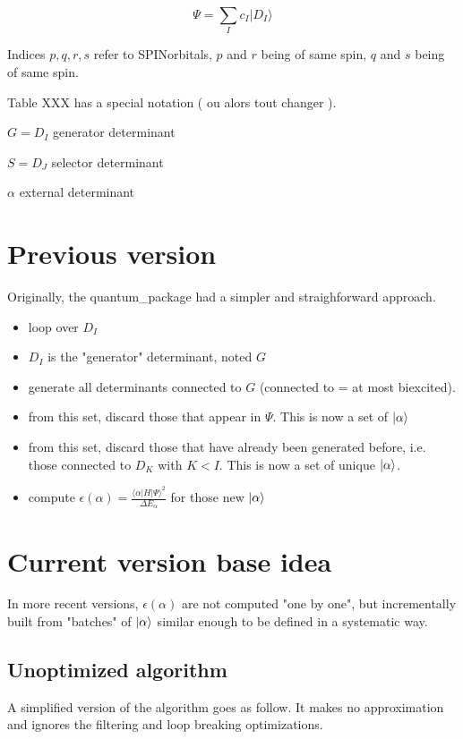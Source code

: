 $$\Psi = \sum_I {c_I | D_I \rangle}$$

Indices $p,q,r,s$ refer to SPINorbitals, $p$ and $r$ being of same spin, $q$ and $s$ being of same spin. 

Table XXX has a special notation ( ou alors tout changer ).

$G = D_I$ generator determinant

$S = D_J$ selector determinant

$\alpha$ external determinant

\section{Previous version}

Originally, the quantum\_package had a simpler and straighforward approach. 

\begin{itemize}
\item
loop over $D_I$
\item
$D_I$ is the "generator" determinant, noted $G$
\item
generate all determinants connected to $G$ (connected to = at most biexcited).
\item
from this set, discard those that appear in $\Psi$. This is now a set of $| \alpha \rangle$
\item
from this set, discard those that have already been generated before, i.e. those connected to $D_K$ with $K<I$. This is now a set of unique $| \alpha \rangle$.
\item
compute $\epsilon(\alpha) = \frac{\langle \alpha|H|\Psi\rangle^2}{\Delta E_\alpha}$ for those new $| \alpha \rangle$
\end{itemize}

\section{Current version base idea}



In more recent versions, $\epsilon(\alpha)$ are not computed "one by one", but incrementally built from "batches" of $| \alpha \rangle$ similar enough to be defined in a systematic way.

\subsection{Unoptimized algorithm}

A simplified version of the algorithm goes as follow. It makes no approximation and ignores the filtering and loop breaking optimizations.



